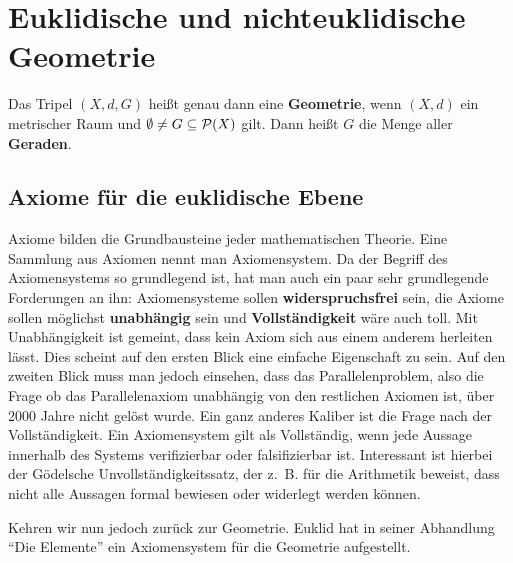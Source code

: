 \chapter{Euklidische und nichteuklidische Geometrie}

\begin{definition}%
    Das Tripel $(X, d, G)$ heißt genau dann eine \textbf{Geometrie},
    wenn $(X, d)$ ein metrischer Raum und $\emptyset \neq G \subseteq \mathcal{P}(X)$
    gilt. Dann heißt $G$ die Menge aller \textbf{Geraden}.
\end{definition}

\section{Axiome für die euklidische Ebene}
Axiome bilden die Grundbausteine jeder mathematischen Theorie. Eine
Sammlung aus Axiomen nennt man Axiomensystem.
Da der Begriff des Axiomensystems so grundlegend ist, hat man auch 
ein paar sehr grundlegende Forderungen an ihn: Axiomensysteme sollen
\textbf{widerspruchsfrei} sein, die Axiome sollen möglichst
\textbf{unabhängig} sein und \textbf{Vollständigkeit} wäre auch toll.
Mit Unabhängigkeit ist gemeint, dass kein Axiom sich aus einem anderem
herleiten lässt. Dies scheint auf den ersten Blick eine einfache
Eigenschaft zu sein. Auf den zweiten Blick muss man jedoch einsehen, 
dass das Parallelenproblem, also die Frage ob das Parallelenaxiom 
unabhängig von den restlichen Axiomen ist, über 2000 Jahre nicht 
gelöst wurde. Ein ganz anderes Kaliber ist die Frage nach der
Vollständigkeit. Ein Axiomensystem gilt als Vollständig, wenn
jede Aussage innerhalb des Systems verifizierbar oder falsifizierbar
ist. Interessant ist hierbei der Gödelsche Unvollständigkeitssatz, 
der z.~B. für die Arithmetik beweist, dass nicht alle Aussagen
formal bewiesen oder widerlegt werden können.

Kehren wir nun jedoch zurück zur Geometrie. Euklid hat in seiner 
Abhandlung \enquote{Die Elemente} ein Axiomensystem für die Geometrie
aufgestellt. 

